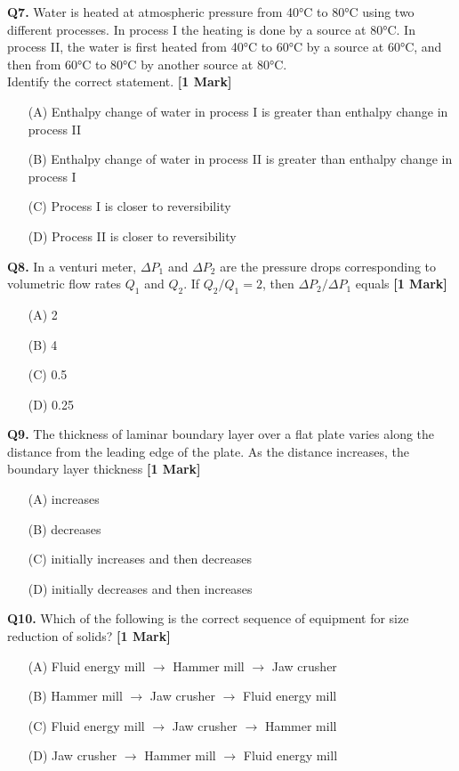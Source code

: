 \documentclass[11pt]{article}
\newcommand{\questiona}[2]{
    \noindent\textbf{Q#2.} #1 \hfill \textbf{[1 Mark]}
}
\begin{document}
\questiona{Water is heated at atmospheric pressure from 40°C to 80°C using two different processes. In process I the heating is done by a source at 80°C. In process II, the water is first heated from 40°C to 60°C by a source at 60°C, and then from 60°C to 80°C by another source at 80°C. \\ Identify the correct statement.}{7}
\begin{enumerate}
    \item[(A)] Enthalpy change of water in process I is greater than enthalpy change in process II  
    \item[(B)] Enthalpy change of water in process II is greater than enthalpy change in process I  
    \item[(C)] Process I is closer to reversibility  
    \item[(D)] Process II is closer to reversibility  
\end{enumerate}
\vspace{0.5cm}

\questiona{In a venturi meter, \( \Delta P_1 \) and \( \Delta P_2 \) are the pressure drops corresponding to volumetric flow rates \( Q_1 \) and \( Q_2 \). If \( Q_2/Q_1 = 2 \), then \( \Delta P_2 / \Delta P_1 \) equals}{8}
\begin{enumerate}
    \item[(A)] 2  
    \item[(B)] 4  
    \item[(C)] 0.5  
    \item[(D)] 0.25  
\end{enumerate}
\vspace{0.5cm}

\questiona{The thickness of laminar boundary layer over a flat plate varies along the distance from the leading edge of the plate. As the distance increases, the boundary layer thickness}{9}
\begin{enumerate}
    \item[(A)] increases  
    \item[(B)] decreases  
    \item[(C)] initially increases and then decreases  
    \item[(D)] initially decreases and then increases  
\end{enumerate}
\vspace{0.5cm}

\questiona{Which of the following is the correct sequence of equipment for size reduction of solids?}{10}
\begin{enumerate}
    \item[(A)] Fluid energy mill \( \rightarrow \) Hammer mill \( \rightarrow \) Jaw crusher  
    \item[(B)] Hammer mill \( \rightarrow \) Jaw crusher \( \rightarrow \) Fluid energy mill  
    \item[(C)] Fluid energy mill \( \rightarrow \) Jaw crusher \( \rightarrow \) Hammer mill  
    \item[(D)] Jaw crusher \( \rightarrow \) Hammer mill \( \rightarrow \) Fluid energy mill  
\end{enumerate}
\vspace{0.5cm}
\end{document}
